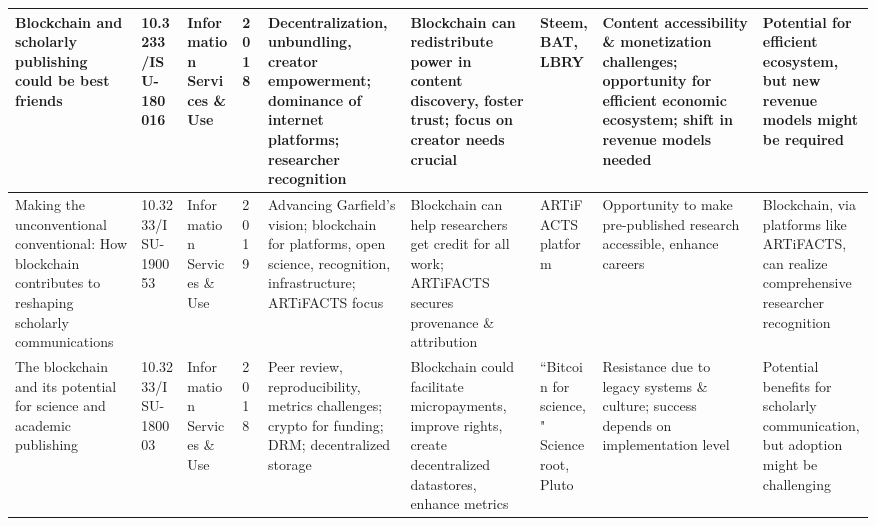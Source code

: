 \documentclass{article}
\begin{document}
\begin{landscape}
\begin{tabularx}{\linewidth}{|p{3.5cm}|p{2.5cm}|p{3cm}|p{1.8cm}|X|X|X|X|X|}
        Blockchain and scholarly publishing could be best friends                                                                          & 10.3233/ISU-180016              & Information Services \& Use                                                   & 2018                      & Decentralization, unbundling, creator empowerment; dominance of internet platforms; researcher recognition                  & Blockchain can redistribute power in content discovery, foster trust; focus on creator needs crucial                                           & Steem, BAT, LBRY                                                                                        & Content accessibility \& monetization challenges; opportunity for efficient economic ecosystem; shift in revenue models needed      & Potential for efficient ecosystem, but new revenue models might be required                           \\
        \hline

        Making the unconventional conventional: How blockchain contributes to reshaping scholarly communications                           & 10.3233/ISU-190053              & Information Services \& Use                                                   & 2019                      & Advancing Garfield's vision; blockchain for platforms, open science, recognition, infrastructure; ARTiFACTS focus           & Blockchain can help researchers get credit for all work; ARTiFACTS secures provenance \& attribution                                           & ARTiFACTS platform                                                                                      & Opportunity to make pre-published research accessible, enhance careers                                                              & Blockchain, via platforms like ARTiFACTS, can realize comprehensive researcher recognition            \\
        \hline

        The blockchain and its potential for science and academic publishing                                                               & 10.3233/ISU-180003              & Information Services \& Use                                                   & 2018                      & Peer review, reproducibility, metrics challenges; crypto for funding; DRM; decentralized storage                            & Blockchain could facilitate micropayments, improve rights, create decentralized datastores, enhance metrics                                    & ``Bitcoin for science," Scienceroot, Pluto                                                              & Resistance due to legacy systems \& culture; success depends on implementation level                                                & Potential benefits for scholarly communication, but adoption might be challenging                     \\
        \hline


\end{tabularx}
\end{landscape}
\end{document}

